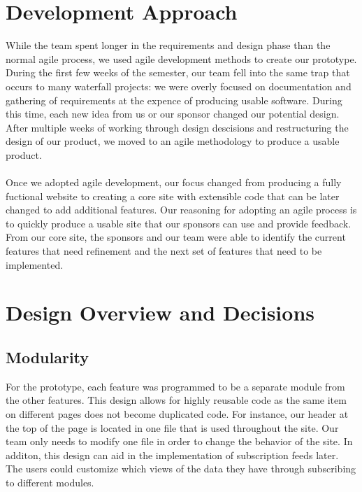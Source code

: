 \documentclass[12pt]{article}
\begin{document}
\begin{spacing}{1.5}
\section{Development Approach}
 While the team spent longer in the requirements and design phase than the normal agile process, we used agile development methods to create our prototype. During the first few weeks of the semester, our team fell into the same trap that occurs to many waterfall projects: we were overly focused on documentation and gathering of requirements at the expence of producing usable software. During this time, each new idea from us or our sponsor changed our potential design. After multiple weeks of working through design descisions and restructuring the design of our product, we moved to an agile methodology to produce a usable product. 
\\ \\
Once we adopted agile development, our focus changed from producing a fully fuctional website to creating a core site with extensible code that can be later changed to add additional features. Our reasoning for adopting an agile process is to quickly produce a usable site that our sponsors can use and provide feedback. From our core site, the sponsors and our team were able to identify the current features that need refinement and the next set of features that need to be implemented. 


\section{Design Overview and Decisions}
\subsection{Modularity}
For the prototype, each feature was programmed to be a separate module from the other features. This design allows for highly reusable code as the same item on different pages does not become duplicated code. For instance, our header at the top of the page is located in one file that is used throughout the site. Our team only needs to modify one file in order to change the behavior of the site. In additon, this design can aid in the implementation of subscription feeds later. The users could customize which views of the data they have through subscribing to different modules.


\end{spacing}
\end{document}
